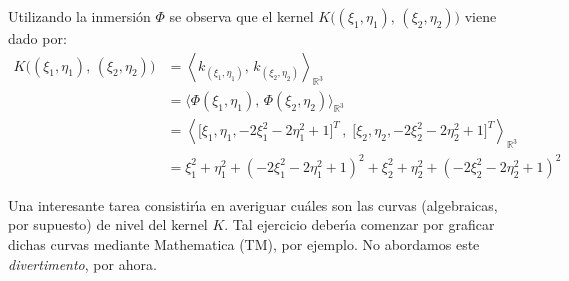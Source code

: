 \begin{center}
\end{center}



\smallskip\noindent
Utilizando la inmersi\'on $\Phi$ se observa que el kernel
$K\big( (\xi_1,\eta_1),\,(\xi_2,\eta_2) \big)$ viene dado por:
\begin{align*}
K\big( (\xi_1,\eta_1),\,(\xi_2,\eta_2) \big)
&= \left\langle k_{(\xi_1,\eta_1)},\,k_{(\xi_2,\eta_2)}
   \right\rangle_{\mathbb{R}^3} \\
&= \big\langle \Phi(\xi_1,\eta_1),\,\Phi(\xi_2,\eta_2)
   \big\rangle_{\mathbb{R}^3} \\
&= \left\langle \big[\xi_1,\eta_1,-2\xi_1^2-2\eta_1^2+1\big]^T\,,\;
   \big[\xi_2,\eta_2,-2\xi_2^2-2\eta_2^2+1\big]^T
   \right\rangle_{\mathbb{R}^3} \\
&= \xi_1^2 + \eta_1^2 + \left(-2\xi_1^2-2\eta_1^2+1\right)^2 +
   \xi_2^2 + \eta_2^2 + \left(-2\xi_2^2-2\eta_2^2+1\right)^2
\end{align*} 





Una interesante tarea consistir\'\i a en averiguar cu\'ales son
las curvas (algebraicas, por supuesto) de nivel del kernel $K$.
Tal ejercicio deber\'\i a comenzar por graficar dichas curvas
mediante Mathematica (TM), por ejemplo.
No abordamos este {\em divertimento\/}, por ahora.

